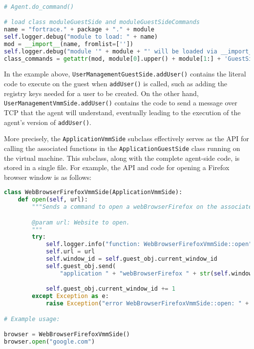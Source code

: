 \documentclass[letterpaper,12pt]{report}
\newcommand{\passthrough}[1]{#1}
\begin{document}
\begin{lstlisting}[language=Python]

# Agent.do_command()

# load class moduleGuestSide and moduleGuestSideCommands
name = "fortrace." + package + "." + module
self.logger.debug("module to load: " + name)
mod = __import__(name, fromlist=[''])
self.logger.debug("module '" + module + "' will be loaded via __import__")
class_commands = getattr(mod, module[0].upper() + module[1:] + 'GuestSideCommands')
\end{lstlisting}

In the example above,
\passthrough{\lstinline!UserManagementGuestSide.addUser()!} contains the
literal code to execute on the guest when
\passthrough{\lstinline!addUser()!} is called, such as adding the
registry keys needed for a user to be created. On the other hand,
\passthrough{\lstinline!UserManagementVmmSide.addUser()!} contains the
code to send a message over TCP that the agent will understand,
eventually leading to the execution of the agent's version of
\passthrough{\lstinline!addUser()!}.

More precisely, the \passthrough{\lstinline!ApplicationVmmSide!}
subclass effectively serves as the API for calling the associated
functions in the \passthrough{\lstinline!ApplicationGuestSide!} class
running on the virtual machine. This subclass, along with the complete
agent-side code, is stored in a single file. For example, the API and
code for opening a Firefox browser window is as follows:

\begin{lstlisting}[language=Python]
class WebBrowserFirefoxVmmSide(ApplicationVmmSide):
    def open(self, url):
        """Sends a command to open a webBrowserFirefox on the associated guest.

        @param url: Website to open.
        """
        try:
            self.logger.info("function: WebBrowserFirefoxVmmSide::open")
            self.url = url
            self.window_id = self.guest_obj.current_window_id
            self.guest_obj.send(
                "application " + "webBrowserFirefox " + str(self.window_id) + " open " + self.webBrowserFirefox + " " + self.url)

            self.guest_obj.current_window_id += 1
        except Exception as e:
            raise Exception("error WebBrowserFirefoxVmmSide::open: " + str(e))

# Example usage:

browser = WebBrowserFirefoxVmmSide()
browser.open("google.com")
\end{lstlisting}
\end{document}
